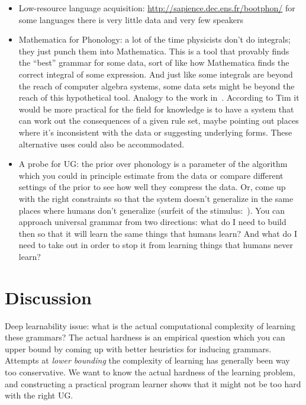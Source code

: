 \documentclass{article}
\begin{document}
\begin{itemize}
\item Low-resource language acquisition: \url{http://sapience.dec.ens.fr/bootphon/} for some languages there is very little data and very few speakers
\item Mathematica for Phonology: a lot of the time physicists don't do
  integrals; they just punch them into Mathematica. This is a tool
  that provably finds the ``best'' grammar for some data, sort of like
  how Mathematica finds the correct integral of some expression. And
  just like some integrals are beyond the reach of computer algebra
  systems, some data sets might be beyond the reach of this
  hypothetical tool. Analogy to the work
  in~\cite{schmidt2009distilling}. According to Tim it would be more
  practical for the field for knowledge is to have a system that can
  work out the consequences of a given rule set, maybe pointing out
  places where it's inconsistent with the data or suggesting
  underlying forms. These alternative uses could also be accommodated.
\item A probe for UG: the prior over phonology is a parameter of the
  algorithm which you could in principle estimate from the data or
  compare different settings of the prior to see how well they
  compress the data. Or, come up with the right constraints so that
  the system doesn't generalize in the same places where humans don't
  generalize (surfeit of the stimulus:~\cite{becker2011surfeit}). You
  can approach universal grammar from two directions: what do I need
  to build then so that it will learn the same things that humans
  learn? And what do I need to take out in order to stop it from
  learning things that humans never learn? 
\end{itemize}

\section{Discussion}

Deep learnability issue: what is the actual computational complexity
of learning these grammars? The actual hardness is an empirical
question which you can upper bound by coming up with better heuristics
for inducing grammars. Attempts at \emph{lower bounding} the
complexity of learning has generally been way too conservative. We
want to know the actual hardness of the learning problem, and
constructing a practical program learner shows that it might not be
too hard with the right UG.
\end{document}

